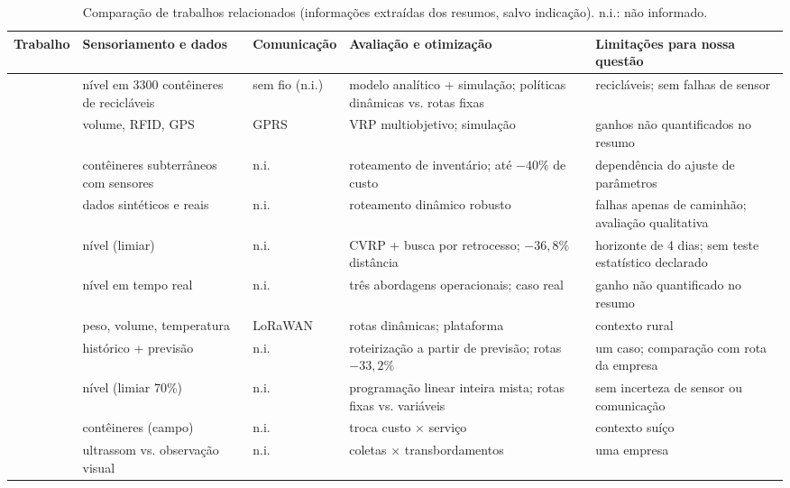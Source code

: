\begin{table}[ht]
\centering
\caption{Comparação de trabalhos relacionados (informações extraídas dos resumos, salvo indicação). n.i.: não informado.}
\label{tab:relacionados}
\scriptsize
\setlength{\tabcolsep}{3pt}
\renewcommand{\arraystretch}{1.12}
\begin{tabularx}{\textwidth}{@{}>{\raggedright\arraybackslash}p{3.45cm}>{\raggedright\arraybackslash}X>{\raggedright\arraybackslash}p{1.95cm}>{\raggedright\arraybackslash}X>{\raggedright\arraybackslash}X@{}}
\toprule
Trabalho & Sensoriamento e dados & Comunicação & Avaliação e otimização & Limitações para nossa questão \\
\midrule
\cite{johansson2006effect} & nível em \num{3300} contêineres de recicláveis & sem fio (n.i.) & modelo analítico + simulação; políticas dinâmicas vs. rotas fixas & recicláveis; sem falhas de sensor \\
\cite{faccio2011waste} & volume, RFID, GPS & GPRS & VRP multiobjetivo; simulação & ganhos não quantificados no resumo \\
\cite{mes2014inventory} & contêineres subterrâneos com sensores & n.i. & roteamento de inventário; até $-40\%$ de custo & dependência do ajuste de parâmetros \\
\cite{anagnostopoulos2015robust} & dados sintéticos e reais & n.i. & roteamento dinâmico robusto & falhas apenas de caminhão; avaliação qualitativa \\
\cite{akhtar2017backtracking} & nível (limiar) & n.i. & CVRP + busca por retrocesso; $-36{,}8\%$ distância & horizonte de 4 dias; sem teste estatístico declarado \\
\cite{ramos2018smart} & nível em tempo real & n.i. & três abordagens operacionais; caso real & ganho não quantificado no resumo \\
\cite{lozano2018smart} & peso, volume, temperatura & LoRaWAN & rotas dinâmicas; plataforma & contexto rural \\
\cite{ferrer2019bin} & histórico + previsão & n.i. & roteirização a partir de previsão; rotas $-33{,}2\%$ & um caso; comparação com rota da empresa \\
\cite{hannan2020waste} & nível (limiar 70\%) & n.i. & programação linear inteira mista; rotas fixas vs. variáveis & sem incerteza de sensor ou comunicação \\
\cite{barth2023data} & 98 contêineres (campo) & n.i. & troca custo $\times$ serviço & contexto suíço \\
\cite{brouwer2023comparison} & ultrassom vs. observação visual & n.i. & coletas $\times$ transbordamentos & uma empresa \\

\end{tabularx}
\end{table}
